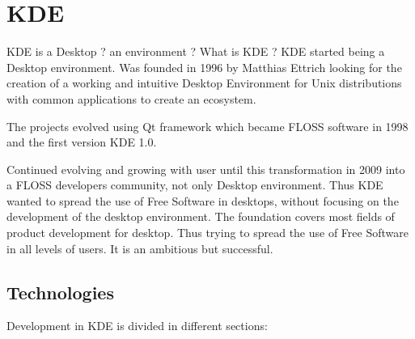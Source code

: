 \section{KDE}
\label{sec:kde}

\par KDE is a Desktop ? an environment ? What is KDE ? KDE started being a Desktop environment. Was founded in 1996 by Matthias Ettrich looking for the creation of a working and intuitive Desktop Environment for Unix distributions with common applications to create an ecosystem.

\par The projects evolved using Qt framework which became FLOSS software in 1998 and the first version KDE 1.0.

\par Continued evolving and growing with user until this transformation in 2009 into a FLOSS developers community, not only Desktop environment. Thus KDE wanted to spread the use of Free Software in desktops, without focusing on the development of the desktop environment. The foundation covers most fields of product development for desktop. Thus trying to spread the use of Free Software in all levels of users. It is an ambitious but successful.

\subsection{Technologies}

\par Development in KDE is divided in different sections:

